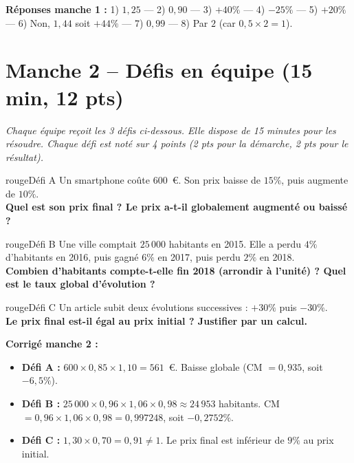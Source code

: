 \documentclass[12pt,a4paper]{article}
\begin{document}
\vspace{0.3cm}
\textbf{Réponses manche 1 :} 1) \(1{,}25\) — 2) \(0{,}90\) — 3) \(+40\%\) — 4) \(-25\%\) — 5) \(+20\%\) — 6) Non, \(1{,}44\) soit \(+44\%\) — 7) \(0{,}99\) — 8) Par \(2\) (car \(0{,}5 \times 2 = 1\)).

\newpage

\section*{Manche 2 -- Défis en équipe (15 min, 12 pts)}

\textit{Chaque équipe reçoit les 3 défis ci-dessous. Elle dispose de 15 minutes pour les résoudre. Chaque défi est noté sur 4 points (2 pts pour la démarche, 2 pts pour le résultat).}

\vspace{0.3cm}

\begin{carte}{rouge}{Défi A}
Un smartphone coûte \(600\)~\euro{}. Son prix baisse de \(15\%\), puis augmente de \(10\%\).\\[0.2cm]
\textbf{Quel est son prix final ? Le prix a-t-il globalement augmenté ou baissé ?}
\end{carte}

\begin{carte}{rouge}{Défi B}
Une ville comptait \(25\,000\) habitants en 2015. Elle a perdu \(4\%\) d’habitants en 2016, puis gagné \(6\%\) en 2017, puis perdu \(2\%\) en 2018.\\[0.2cm]
\textbf{Combien d’habitants compte-t-elle fin 2018 (arrondir à l’unité) ? Quel est le taux global d’évolution ?}
\end{carte}

\begin{carte}{rouge}{Défi C}
Un article subit deux évolutions successives : \(+30\%\) puis \(-30\%\).\\[0.2cm]
\textbf{Le prix final est-il égal au prix initial ? Justifier par un calcul.}
\end{carte}

\vspace{0.3cm}
\textbf{Corrigé manche 2 :}
\begin{itemize}
    \item \textbf{Défi A :} \(600 \times 0{,}85 \times 1{,}10 = 561\)~\euro{}. Baisse globale (CM \(= 0{,}935\), soit \(-6{,}5\%\)).
    \item \textbf{Défi B :} \(25\,000 \times 0{,}96 \times 1{,}06 \times 0{,}98 \approx 24\,953\) habitants. CM \(= 0{,}96 \times 1{,}06 \times 0{,}98 = 0{,}997248\), soit \(-0{,}2752\%\).
    \item \textbf{Défi C :} \(1{,}30 \times 0{,}70 = 0{,}91 \neq 1\). Le prix final est inférieur de \(9\%\) au prix initial.
\end{itemize}
\end{document}
